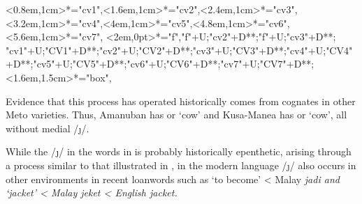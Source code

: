 \begin{multicols}{3}
\begin{exe}
{\begin{xlist}
{				<0.8em,1cm>*="cv1",<1.6em,1cm>*="cv2",<2.4em,1cm>*\as{\j}="cv3",<3.2em,1cm>*="cv4",<4em,1cm>*\as{ }="cv5",<4.8em,1cm>*="cv6",<5.6em,1cm>*\as{ }="cv7",
				<2em,0pt>*\as{\tsc{[+fr.]}}="f","f"+U;"cv2"+D**\dir{-};"f"+U;"cv3"+D**\dir{-};
				"cv1"+U;"CV1"+D**\dir{-};"cv2"+U;"CV2"+D**\dir{-};"cv3"+U;"CV3"+D**\dir{-};"cv4"+U;"CV4"+D**\dir{-};"cv5"+U;"CV5"+D**\dir{};"cv6"+U;"CV6"+D**\dir{-};"cv7"+U;"CV7"+D**\dir{};
				<1.6em,1.5cm>*="box",
			\endxy}\label{as:bijae3}
		\end{xlist}}\label{as:bijae}
	\end{exe}
\end{multicols}

Evidence that this process has operated historically
comes from cognates in other Meto varieties.
Thus, Amanuban has  or  `cow'
and Kusa-Manea has  or  `cow',
all without medial /\j/. 

While the /\j/ in the words in  is probably historically epenthetic,
arising through a process similar to that illustrated in ,
in the modern language /\j/ also occurs in other environments in recent loanwords
such as  `to become' < Malay \it{jadi}
and  `jacket' < Malay \emph{jeket} < English \emph{jacket}.